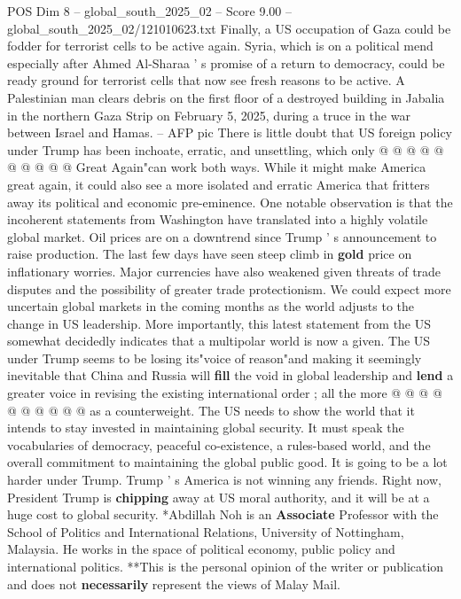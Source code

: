 \begin{textsample}{POS Dim 8 – global\_south\_2025\_02 – Score 9.00 – global\_south\_2025\_02/121010623.txt}
Finally, a US occupation of Gaza could be fodder for terrorist cells to be active again.
Syria, which is on a political mend especially after Ahmed Al-Sharaa ' s promise of a return to democracy, could be ready ground for terrorist cells that now see fresh reasons to be active.
A Palestinian man clears debris on the first floor of a destroyed building in Jabalia in the northern Gaza Strip on February 5, 2025, during a truce in the war between Israel and Hamas. -- AFP pic There is little doubt that US foreign policy under Trump has been inchoate, erratic, and unsettling, which only @ @ @ @ @ @ @ @ @ @ Great Again"can work both ways.
While it might make America great again, it could also see a more isolated and erratic America that fritters away its political and economic pre-eminence.
One notable observation is that the incoherent statements from Washington have translated into a highly volatile global market.
Oil prices are on a downtrend since Trump ' s announcement to raise production.
The last few days have seen steep climb in \textbf{gold} price on inflationary worries.
Major currencies have also weakened given threats of trade disputes and the possibility of greater trade protectionism.
We could expect more uncertain global markets in the coming months as the world adjusts to the change in US leadership.
More importantly, this latest statement from the US somewhat decidedly indicates that a multipolar world is now a given.
The US under Trump seems to be losing its"voice of reason"and making it seemingly inevitable that China and Russia will \textbf{fill} the void in global leadership and \textbf{lend} a greater voice in revising the existing international order ; all the more @ @ @ @ @ @ @ @ @ @ as a counterweight.
The US needs to show the world that it intends to stay invested in maintaining global security.
It must speak the vocabularies of democracy, peaceful co-existence, a rules-based world, and the overall commitment to maintaining the global public good.
It is going to be a lot harder under Trump.
Trump ' s America is not winning any friends.
Right now, President Trump is \textbf{chipping} away at US moral authority, and it will be at a huge cost to global security. *Abdillah Noh is an \textbf{Associate} Professor with the School of Politics and International Relations, University of Nottingham, Malaysia.
He works in the space of political economy, public policy and international politics. **This is the personal opinion of the writer or publication and does not \textbf{necessarily} represent the views of Malay Mail.

\end{textsample}
